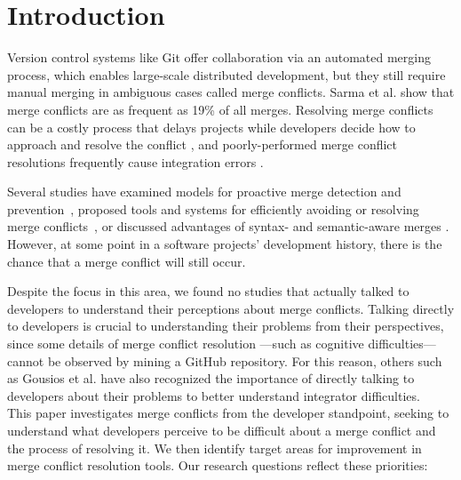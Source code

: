 \section{Introduction}\label{introduction}


Version control systems like Git offer collaboration via an automated merging process, which enables large-scale distributed development, but they still require manual merging in ambiguous cases called merge conflicts. Sarma et al. \cite{cassandra} show that merge conflicts are as frequent as 19\% of all merges. Resolving merge conflicts can be a costly process that delays projects while developers decide how to approach and resolve the conflict \cite{cassandra}, and poorly-performed merge conflict resolutions frequently cause integration errors \cite{bird-branches-conflict}.


Several studies have examined models for proactive merge detection and prevention~\cite{Brun2011}\cite{palantir}\cite{Guimaraes}, proposed tools and systems for efficiently avoiding or resolving merge conflicts~\cite{nishimura}\cite{mens2002state}, or discussed advantages of syntax- and semantic-aware merges \cite{danny_refactorings}\cite{hunt2002extensible}. However, at some point in a software projects' development history, there is the chance that a merge conflict will still occur. 


Despite the focus in this area, we found no studies that actually talked to developers to understand their perceptions about merge conflicts. Talking directly to developers is crucial to understanding their problems from their perspectives, since some details of merge conflict resolution ---such as cognitive difficulties--- cannot be observed by mining a GitHub repository. For this reason, others such as Gousios et al. \cite{integrator_perspective} have also recognized the importance of directly talking to developers about their problems to better understand integrator difficulties.\\

This paper investigates merge conflicts from the developer standpoint, seeking to understand what developers perceive to be difficult about a merge conflict and the process of resolving it. We then identify target areas for improvement in merge conflict resolution tools. Our research questions reflect these priorities: 

